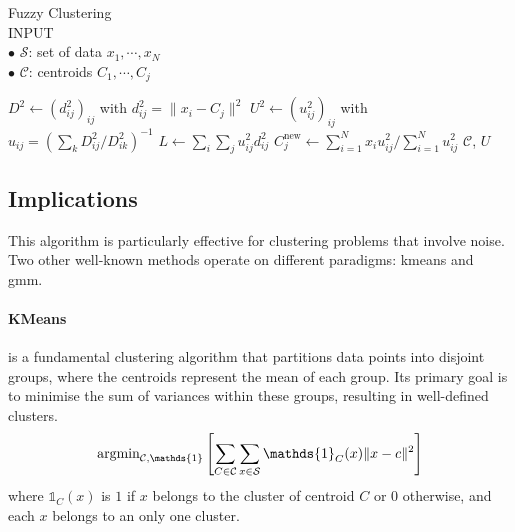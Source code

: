 \begin{algorithm}[h]
\caption{Fuzzy Clustering\\
	\textsc{INPUT}\\
	$\bullet$ $\mathcal{S}$: set of data $x_1,\cdots,x_N$\\
	$\bullet$ $\mathcal{C}$: centroids $C_1,\cdots,C_j$}
\begin{algorithmic}[1]
        \State $D^2 \gets (d^2_{ij})_{ij}$ with $d_{ij}^2=\|x_i-C_j\|^2$
        \State $U^2 \gets (u_{ij}^2)_{ij}$ with $u_{ij}=\left(\sum_{k}D^2_{ij}/D^2_{ik}\right)^{-1}$
        \State $L \gets \sum_i\sum_j u_{ij}^2d_{ij}^2$
            \State $C^\text{new}_j \gets \sum_{i=1}^N x_iu^2_{ij} / \sum_{i=1}^N u^2_{ij}$
        \EndFor
    \EndWhile
    \State \Return $\mathcal{C}$, $U$
\EndFunction
\end{algorithmic}
\label{alg:FuzzyClustering}
\end{algorithm}

\subsection{Implications}
This algorithm is particularly effective for clustering problems that involve noise. Two other well-known methods operate on different paradigms: \gls{kmeans} and \gls{gmm}.

\paragraph{KMeans} is a fundamental clustering algorithm that partitions data points into disjoint groups, where the centroids represent the mean of each group. Its primary goal is to minimise the sum of variances within these groups, resulting in well-defined clusters.
\begin{equation*}
	\textnormal{argmin}_{\mathcal{C}, \mathds{1}}\left[\sum_{C\in\mathcal{C}}\sum_{x \in \mathcal{S}}\mathds{1}_C(x)\|x-c\|^2\right]
\end{equation*}
where $\mathds{1}_C(x)$ is $1$ if $x$ belongs to the cluster of centroid $C$ or $0$ otherwise, and each $x$ belongs to an only one cluster.

